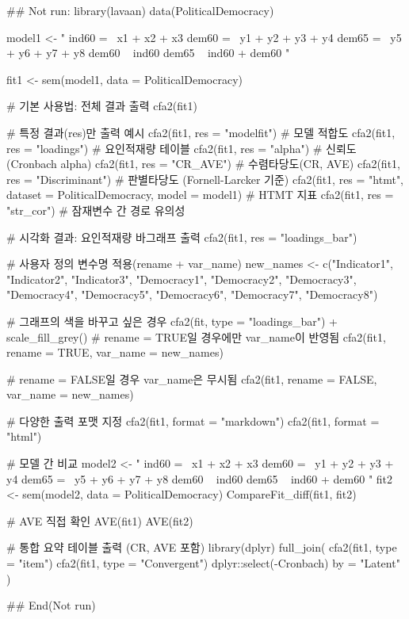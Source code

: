 \documentclass[a4paper]{book}
\begin{document}
%
\begin{Examples}
\begin{ExampleCode}
## Not run: 
library(lavaan)
data(PoliticalDemocracy)

model1 <- "
  ind60 =~ x1 + x2 + x3
  dem60 =~ y1 + y2 + y3 + y4
  dem65 =~ y5 + y6 + y7 + y8
  dem60 ~ ind60
  dem65 ~ ind60 + dem60
"

fit1 <- sem(model1, data = PoliticalDemocracy)

# 기본 사용법: 전체 결과 출력
cfa2(fit1)

# 특정 결과(res)만 출력 예시
cfa2(fit1, res = "modelfit")        # 모델 적합도
cfa2(fit1, res = "loadings")        # 요인적재량 테이블
cfa2(fit1, res = "alpha")           # 신뢰도(Cronbach alpha)
cfa2(fit1, res = "CR_AVE")          # 수렴타당도(CR, AVE)
cfa2(fit1, res = "Discriminant")    # 판별타당도 (Fornell-Larcker 기준)
cfa2(fit1, res = "htmt", dataset = PoliticalDemocracy, model = model1)  # HTMT 지표
cfa2(fit1, res = "str_cor")         # 잠재변수 간 경로 유의성

# 시각화 결과: 요인적재량 바그래프 출력
cfa2(fit1, res = "loadings_bar")

# 사용자 정의 변수명 적용(rename + var_name)
new_names <- c("Indicator1", "Indicator2", "Indicator3",
               "Democracy1", "Democracy2", "Democracy3", "Democracy4",
               "Democracy5", "Democracy6", "Democracy7", "Democracy8")

# 그래프의 색을 바꾸고 싶은 경우
cfa2(fit, type = "loadings_bar") +
scale_fill_grey()
# rename = TRUE일 경우에만 var_name이 반영됨
cfa2(fit1, rename = TRUE, var_name = new_names)

# rename = FALSE일 경우 var_name은 무시됨
cfa2(fit1, rename = FALSE, var_name = new_names)

# 다양한 출력 포맷 지정
cfa2(fit1, format = "markdown")
cfa2(fit1, format = "html") %

# 모델 간 비교
model2 <- "
  ind60 =~ x1 + x2 + x3
  dem60 =~ y1 + y2 + y3 + y4
  dem65 =~ y5 + y6 + y7 + y8
  dem60 ~ ind60
  dem65 ~ ind60 + dem60
"
fit2 <- sem(model2, data = PoliticalDemocracy)
CompareFit_diff(fit1, fit2)

# AVE 직접 확인
AVE(fit1)
AVE(fit2)

# 통합 요약 테이블 출력 (CR, AVE 포함)
library(dplyr)
full_join(
  cfa2(fit1, type = "item") %
  cfa2(fit1, type = "Convergent") %
    dplyr::select(-Cronbach) %
  by = "Latent"
) %

## End(Not run)
\end{ExampleCode}
\end{Examples}
\end{document}
